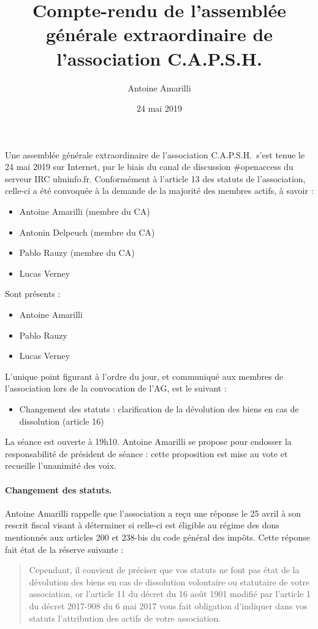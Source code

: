 \documentclass{scrartcl}
\title{Compte-rendu de l'assemblée générale extraordinaire de l'association C.A.P.S.H.}
\author{Antoine Amarilli}
\date{24 mai 2019}
\begin{document}
\maketitle

Une assemblée générale extraordinaire de l'association C.A.P.S.H.\ s'est tenue
le 24 mai 2019 sur Internet, par le biais du canal de discussion \#openaccess du
serveur IRC ulminfo.fr. Conformément à l'article 13 des statuts de
l'association, celle-ci a été convoquée à la demande de la majorité des membres
actifs, à savoir : 

\begin{itemize}
  \item Antoine Amarilli (membre du CA)
  \item Antonin Delpeuch (membre du CA)
  \item Pablo Rauzy (membre du CA)
  \item Lucas Verney
\end{itemize}
% 
Sont présents :

\begin{itemize}
\item Antoine Amarilli
\item Pablo Rauzy
\item Lucas Verney
\end{itemize}
%
L'unique point figurant à l'ordre du jour, et communiqué aux membres de
l'association lors de la convocation de l'AG, est le suivant :

\begin{itemize}
\item Changement des statuts : clarification de la dévolution des biens en cas
  de dissolution (article 16)
\end{itemize}
%
La séance est ouverte à 19h10. Antoine Amarilli se propose pour endosser la
responsabilité de président de séance : cette proposition est mise au vote et
recueille l'unanimité des voix.

\paragraph{Changement des statuts.} 
Antoine Amarilli rappelle que l'association a reçu une réponse le 25 avril à son
rescrit fiscal visant à déterminer si celle-ci est éligible au régime des dons
mentionnés aux articles 200 et 238-bis du code général des impôts. Cette réponse
fait état de la réserve suivante :
\begin{quote}
  \og Cependant, il convient de préciser que
vos statuts ne font pas état de la dévolution des biens en cas de dissolution
volontaire ou statutaire de votre association, or l'article 11 du décret du 16
août 1901 modifié par l'article 1 du décret 2017-908 du 6 mai 2017 vous fait
obligation d'indiquer dans vos statuts l'attribution des actifs de votre
association. \fg
\end{quote}
\end{document}
